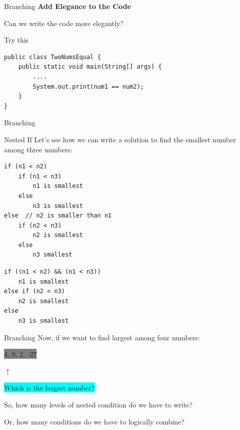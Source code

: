 \documentclass[12pt]{beamer}
\begin{document}
\begin{frame}[fragile]{Branching}
\textbf{Add Elegance to the Code}

Can we write the code more elegantly?

\begin{block}{Try this}
 \begin{lstlisting}[numbers=none]
public class TwoNumsEqual {
    public static void main(String[] args) {
        ....
        System.out.print(num1 == num2);
    }
}
 \end{lstlisting}
\end{block}
\end{frame}

\begin{frame}[fragile]{Branching}
 \begin{block}{Nested If}
  Let's see how we can write a solution to find the smallest number among three numbers:
 \end{block}
\begin{minipage}{5.3cm}
 \begin{lstlisting}[numbers=none, frame=single]
if (n1 < n2)  
    if (n1 < n3)  
        n1 is smallest
    else  			
        n3 is smallest
else  // n2 is smaller than n1
    if (n2 < n3)  
        n2 is smallest
    else 
        n3 smallest   	
 \end{lstlisting}
\end{minipage}
\quad
\begin{minipage}{4.7cm}
 \begin{lstlisting}[numbers=none,frame=single]
if ((n1 < n2) && (n1 < n3))
    n1 is smallest
else if (n2 < n3)
    n2 is smallest
else
    n3 is smallest
 \end{lstlisting}

\end{minipage}
\end{frame}

\begin{frame}[fragile]{Branching}
 Now, if we want to find largest among four numbers:
 
 \begin{center}
 
\colorbox{gray}{\hspace{2.3cm}4, 9, 2, -27\hspace{2.3cm}}

$\uparrow$
 
\colorbox{cyan}{Which is the largest number?}
  \end{center} 
 So, how many levels of nested condition do we have to write?
 
Or, how many conditions do we have to logically combine? 
\end{frame}
\end{document}
